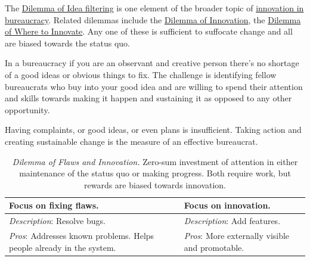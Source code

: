 The \hyperref[table:dilemma-personal-idea-filtering]{Dilemma of Idea filtering} is one element of the broader topic of \hyperref[sec:innovation]{innovation in bureaucracy}. 
Related dilemmas include the \hyperref[table:dilemma-personal-disruptive-or-iterative]{Dilemma of Innovation}, the \hyperref[table:dilemma-personal-where-to-innovate]{Dilemma of Where to Innovate}. Any one of these is sufficient to suffocate change and all are biased towards the status quo.  

In a bureaucracy if you are an observant and creative person there's no shortage of a good ideas or obvious things to fix.
The challenge is identifying fellow bureaucrats who buy into your good idea and are willing to spend their attention and skills towards making it happen and sustaining it as opposed to any other opportunity.

Having complaints, or good ideas, or even plans is insufficient. Taking action and creating sustainable change is the measure of an effective bureaucrat.



\begin{center}
\begin{table}[H] %
\begin{tabular}{ | m{\dilemmatablewidth}| m{\dilemmatablewidth} | } 
  \hline
  \textbf{Focus on fixing flaws.} &
  \textbf{Focus on innovation.} \\
  \hline
  \textit{Description}: Resolve bugs. &
  \textit{Description}: Add features. \\
  \hline
  \textit{Pros}: Addresses known problems. Helps people already in the system.  & 
  \textit{Pros}: More externally visible and promotable. \\
  \hline
\end{tabular}
\caption{
\textit{Dilemma of Flaws and Innovation.}
Zero-sum investment of attention in either maintenance of the status quo or making progress. Both require work, but rewards are biased towards innovation. 
}
\label{table:dilemma-personal-flaws-and-innovation}
\end{table}
\end{center}

